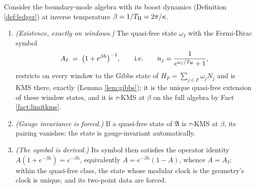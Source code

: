 \begin{theorem}\label{thm:istate}
Consider the boundary-mode algebra with its boost dynamics (Definition \ref{def:ledger}) at inverse temperature $\beta = 1/T_{\mathrm{H}} = 2\pi/\kappa$.
\begin{enumerate}
\item \emph{(Existence, exactly on windows.)} The quasi-free state $\omega_I$ with the Fermi-Dirac symbol
\[
A_I \;=\; \bigl(1 + e^{\beta h}\bigr)^{-1}, \qquad\text{i.e.}\qquad n_j = \frac{1}{e^{\omega_j/T_{\mathrm{H}}} + 1},
\]
restricts on every window to the Gibbs state of $H_F = \sum_{j \in F}\omega_j N_j$ and is KMS there, exactly (Lemma \ref{lem:gibbs}); it is the unique quasi-free extension of these window states, and it is $\tau$-KMS at $\beta$ on the full algebra by Fact \ref{fact:limitkms}.
\item \emph{(Gauge invariance is forced.)} If a quasi-free state of $\mathfrak{A}$ is $\tau$-KMS at $\beta$, its pairing vanishes: the state is gauge-invariant automatically.
\item \emph{(The symbol is derived.)} Its symbol then satisfies the operator identity $A(1 + e^{-\beta h}) = e^{-\beta h}$, equivalently $A = e^{-\beta h}(1 - A)$, whence $A = A_I$: within the quasi-free class, the state whose modular clock is the geometry's clock is unique, and its two-point data are forced.
\end{enumerate}
\end{theorem}

